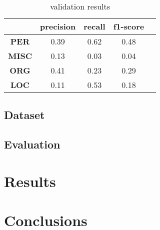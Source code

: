 
\begin{table}[ht]
  \centering
  \begin{tabular}{|c|c|c|c|c|}
    \hline
    \textbf{}     & \textbf{precision} & \textbf{recall} & \textbf{f1-score} \\ \hline
    \textbf{PER}  & 0.39               & 0.62            & 0.48              \\
    \textbf{MISC} & 0.13               & 0.03            & 0.04              \\
    \textbf{ORG}  & 0.41               & 0.23            & 0.29              \\
    \textbf{LOC}  & 0.11               & 0.53            & 0.18              \\ \hline
  \end{tabular}
  \caption{validation results}
  \label{tab:results_validation}
\end{table}
\subsection{Dataset}
\subsection{Evaluation}
\section{Results}
\section{Conclusions}


